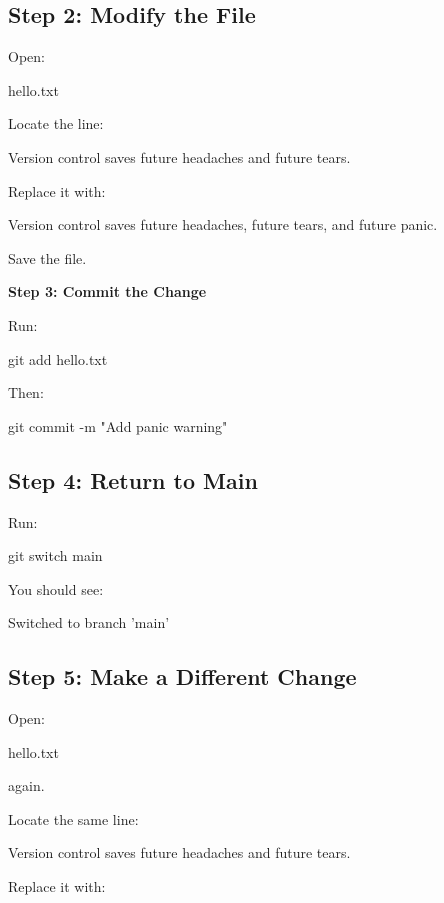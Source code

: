 \documentclass{csc2059practical}
\begin{document}
\subsection{Step 2: Modify the File}
Open:

\begin{terminalplain}
hello.txt
\end{terminalplain}
Locate the line:

\begin{terminalplain}
Version control saves future headaches and future tears.
\end{terminalplain}
Replace it with:

\begin{terminalplain}
Version control saves future headaches, future tears, and future panic.
\end{terminalplain}
Save the file.

\textbf{Step 3: Commit the Change}

Run:

\begin{terminalplain}
git add hello.txt
\end{terminalplain}
Then:

\begin{terminalplain}
git commit -m "Add panic warning"
\end{terminalplain}
\subsection{Step 4: Return to Main}
Run:

\begin{terminalplain}
git switch main
\end{terminalplain}
You should see:

\begin{terminalplain}
Switched to branch 'main'
\end{terminalplain}
\subsection{Step 5: Make a Different Change}
Open:

\begin{terminalplain}
hello.txt
\end{terminalplain}
again.

Locate the same line:

\begin{terminalplain}
Version control saves future headaches and future tears.
\end{terminalplain}
Replace it with:
\end{document}
